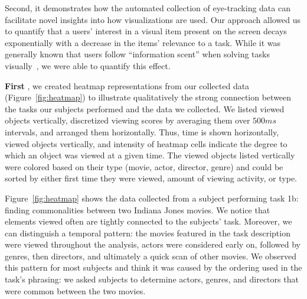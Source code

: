 Second, it demonstrates how the automated collection of eye-tracking data can facilitate novel insights into how visualizations are used. Our approach allowed us to quantify that a users' interest in a visual item present on the screen decays exponentially with a decrease in the items' relevance to a task. While it was generally known that users follow ``information scent'' when solving tasks visually~\cite{informationscent2003},  we were able to quantify this effect. 
 
\vspace{2mm}\noindent
\textbf{First }, we created heatmap representations from our collected data (Figure~\ref{fig:heatmap}) to illustrate qualitatively the strong connection between the tasks our subjects performed and the data we collected. We listed viewed objects vertically, discretized viewing scores by averaging them over $500ms$ intervals, and arranged them horizontally. Thus, time is shown horizontally, viewed objects vertically, and intensity of heatmap cells indicate the degree to which an object was viewed at a given time. The viewed objects listed vertically were colored based on their type (movie, actor, director, genre) and could be sorted by either first time they were viewed, amount of viewing activity, or type.

Figure~\ref{fig:heatmap} shows the data collected from a subject performing task 1b: finding commonalities between two Indiana Jones movies. We notice that elements viewed often are tightly connected to the subjects'  task.   Moreover, we can distinguish a temporal pattern: the movies featured in the task description were viewed throughout the analysis, actors were considered early on, followed by genres, then directors, and ultimately a quick scan of other movies. We observed this pattern for most subjects and think it was caused by the ordering used in the task's phrasing: we asked subjects to determine actors, genres, and directors that were common between the two movies.   

